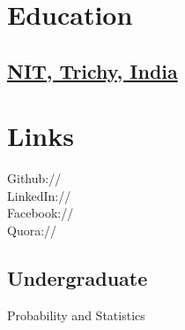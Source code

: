\documentclass[]{deedy-resume-openfont}
\begin{document}
%
%
\lastupdated

%
%



%
%

\begin{minipage}[t]{0.33\textwidth} 


\section{Education} 

\subsection {\href{http://www.nitt.edu/}{NIT, Trichy, India}}


\section{Links} 
Github:// \href{https://github.com/tushar-rishav}{} \\
LinkedIn://  \href{https://www.linkedin.com/in/tusharrishav}{} \\
Facebook://  \href{https://facebook.com/tushar.rishav}{} \\
Quora://  \href{https://www.quora.com/profile/Tushar-Rai-3}{}
\sectionsep


\subsection{Undergraduate}
Probability and Statistics \\

\end{minipage}
\end{document}
